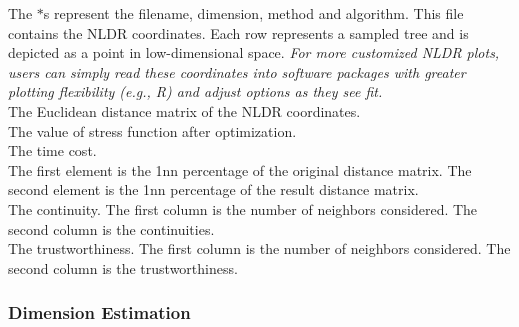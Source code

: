 \documentclass[11pt]{article}
\begin{document}
 The $*$s represent the filename, dimension, method and algorithm. This file contains the NLDR coordinates. Each row represents a sampled tree and is depicted as a
point in low-dimensional space. {\it For more customized NLDR plots, users can simply read these
coordinates into software packages with greater plotting flexibility (e.g., R) and adjust options
as they see fit.} \\


 The Euclidean distance matrix of the NLDR coordinates. \\


  The value of stress function after optimization. \\


 The time cost. \\


 The first element is the 1nn percentage of the original distance matrix. The second element is the 1nn percentage of the result distance matrix. \\


 The continuity. The first column is the number of neighbors considered. The second column is the continuities. \\


 The trustworthiness. The first column is the number of neighbors considered. The second column is the trustworthiness. \\


\newpage
\subsubsection{Dimension Estimation}\label{subsubsect:DimEst}
\end{document}
